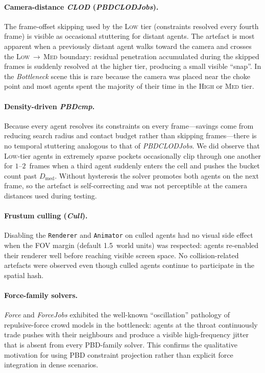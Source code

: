 \paragraph{Camera-distance \textit{CLOD} (\textit{PBDCLODJobs}).}  The
frame-offset skipping used by the \textsc{Low} tier (constraints
resolved every fourth frame) is visible as occasional stuttering for
distant agents.  The artefact is most apparent when a previously
distant agent walks toward the camera and crosses the
\textsc{Low}\,$\rightarrow$\,\textsc{Med} boundary: residual penetration
accumulated during the skipped frames is suddenly resolved at the
higher tier, producing a small visible ``snap''.  In the
\textit{Bottleneck} scene this is rare because the camera was placed
near the choke point and most agents spent the majority of their time
in the \textsc{High} or \textsc{Med} tier.

\paragraph{Density-driven \textit{PBDcmp}.}  Because every agent
resolves its constraints on every frame---savings come from reducing
search radius and contact budget rather than skipping
frames---there is no temporal stuttering analogous to that of
\textit{PBDCLODJobs}.  We did observe that \textsc{Low}-tier agents in
extremely sparse pockets occasionally clip through one another for
$1$--$2$~frames when a third agent suddenly enters the cell and pushes
the bucket count past $D_{\mathrm{med}}$.  Without hysteresis the
solver promotes both agents on the next frame, so the artefact is
self-correcting and was not perceptible at the camera distances used
during testing.

\paragraph{Frustum culling (\textit{Cull}).}  Disabling the
\texttt{Renderer} and \texttt{Animator} on culled agents had no visual
side effect when the FOV margin (default 1.5~world units) was
respected: agents re-enabled their renderer well before reaching
visible screen space.  No collision-related artefacts were observed
even though culled agents continue to participate in the spatial hash.

\paragraph{Force-family solvers.}  \textit{Force} and \textit{ForceJobs}
exhibited the well-known ``oscillation'' pathology of repulsive-force
crowd models in the bottleneck: agents at the throat continuously
trade pushes with their neighbours and produce a visible high-frequency
jitter that is absent from every PBD-family solver.  This confirms the
qualitative motivation for using PBD constraint projection rather than
explicit force integration in dense scenarios.

